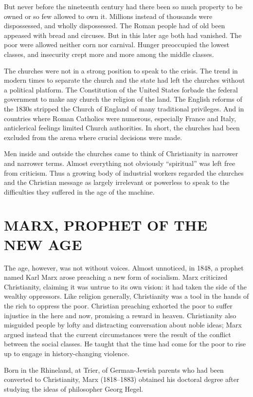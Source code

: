 But never before the nineteenth century had there been so much property to be owned or so few
allowed to own it. Millions instead of thousands were dispossessed, and wholly dispossessed. The
Roman people had of old been appeased with bread and circuses. But in this later age both had
vanished. The poor were allowed neither corn nor carnival. Hunger preoccupied the lowest classes,
and insecurity crept more and more among the middle classes.

The churches were not in a strong position to speak to the crisis. The trend in modern times to
separate the church and the state had left the churches without a political platform. The
Constitution of the United States forbade the federal government to make any church the religion of
the land. The English reforms of the 1830s stripped the Church of England of many traditional
privileges. And in countries where Roman Catholics were numerous, especially France and Italy,
anticlerical feelings limited Church authorities. In short, the churches had been excluded from the
arena where crucial decisions were made.

Men inside and outside the churches came to think of Christianity in narrower and narrower terms.
Almost everything not obviously “spiritual” was left free from criticism. Thus a growing body of
industrial workers regarded the churches and the Christian message as largely irrelevant or
powerless to speak to the difficulties they suffered in the age of the machine.

\section{MARX, PROPHET OF THE NEW AGE}

The age, however, was not without voices. Almost unnoticed, in 1848, a prophet named Karl Marx arose
preaching a new form of socialism. Marx criticized Christianity, claiming it was untrue to its own
vision: it had taken the side of the wealthy oppressors. Like religion generally, Christianity was a
tool in the hands of the rich to oppress the poor. Christian preaching exhorted the poor to suffer
injustice in the here and now, promising a reward in heaven. Christianity also misguided people by
lofty and distracting conversation about noble ideas; Marx argued instead that the current
circumstances were the result of the conflict between the social classes. He taught that the time
had come for the poor to rise up to engage in history-changing violence.

Born in the Rhineland, at Trier, of German-Jewish parents who had been converted to Christianity,
Marx (1818–1883) obtained his doctoral degree after studying the ideas of philosopher Georg Hegel.

